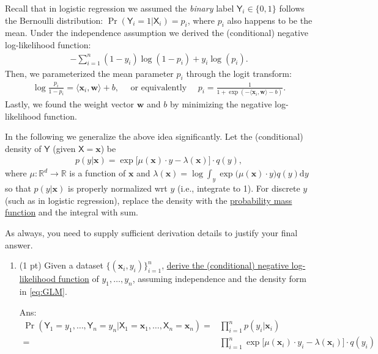\documentclass[10pt]{article}
\newcommand{\RR}{\mathds{R}}
\newcommand{\wv}{\mathbf{w}}
\newcommand{\xv}{\mathbf{x}}
\newcommand{\inner}[2]{\langle #1, #2 \rangle}
\newcommand{\red}[1]{{\color{red}#1}}
\newcommand{\Ysf}{\mathsf{Y}}
\newcommand{\Xsf}{\mathsf{X}}
\newcommand{\ans}[1]{{\color{orange}\textsf{Ans}: #1}}
\begin{document}
\newpage
\begin{exercise}
  Recall that in logistic regression we assumed the \emph{binary} label $\Ysf_i \in \{0,1\}$ follows the Bernoulli distribution: $\Pr(\Ysf_i = 1 | \Xsf_i) = p_i$, where $p_i$ also happens to be the mean. Under the independence assumption we derived the (conditional) negative log-likelihood function:
  \begin{align}
    -\sum_{i=1}^n (1-y_i) \log(1-p_i) + y_i \log(p_i).
  \end{align}
  Then, we parameterized the mean parameter $p_i$ through the logit transform:
  \begin{align}
    \log\frac{p_i}{1-p_i} = \inner{\xv_i}{\wv} + b, \quad \mbox{ or equivalently } \quad p_i = \frac{1}{1+\exp(-\inner{\xv_i}{\wv} - b)}.
  \end{align}
  Lastly, we found the weight vector $\wv$ and $b$ by minimizing the negative log-likelihood function.

  In the following we generalize the above idea significantly. Let the (conditional) density of $\Ysf$ (given $\Xsf= \xv$) be
  \begin{align}
    \label{eq:GLM}
    p(y| \xv) = \exp\Big[ \mu(\xv)\cdot y - \lambda(\xv) \Big] \cdot q(y),
  \end{align}
  where $\mu:\RR^d \to \RR$ is a function of $\xv$ and $\lambda(\xv) = \log \int_y \exp\big( \mu(\xv) \cdot y \big)  q(y) \mathrm{d} y$ so that $p(y|\xv)$ is properly normalized wrt $y$ (i.e., integrate to 1). For discrete $y$ (such as in logistic regression), replace the density with the \href{https://en.wikipedia.org/wiki/Probability_mass_function}{probability mass function} and the integral with sum.

  \red{As always, you need to supply sufficient derivation details to justify your final answer.}

  \begin{enumerate}
    \item (1 pt) Given a dataset $\{(\xv_i, y_i)\}_{i=1}^n$, \uline{derive the (conditional) negative log-likelihood function} of $y_1, \ldots, y_n$, assuming independence and the density form in \eqref{eq:GLM}.

          \ans\\
          \begin{equation*}
            \begin{aligned}
              \Pr(\Ysf_1 = y_1, \ldots, \Ysf_n = y_n | \Xsf_1 = \xv_1, \ldots, \Xsf_n = \xv_n) = & \prod_{i=1}^n p(y_i | \xv_i)                                                     \\
              =                                                                                  & \prod_{i=1}^n \exp\Big[ \mu(\xv_i) \cdot y_i - \lambda(\xv_i) \Big] \cdot q(y_i)
            \end{aligned}
          \end{equation*}


\end{enumerate}
\end{exercise}
\end{document}
